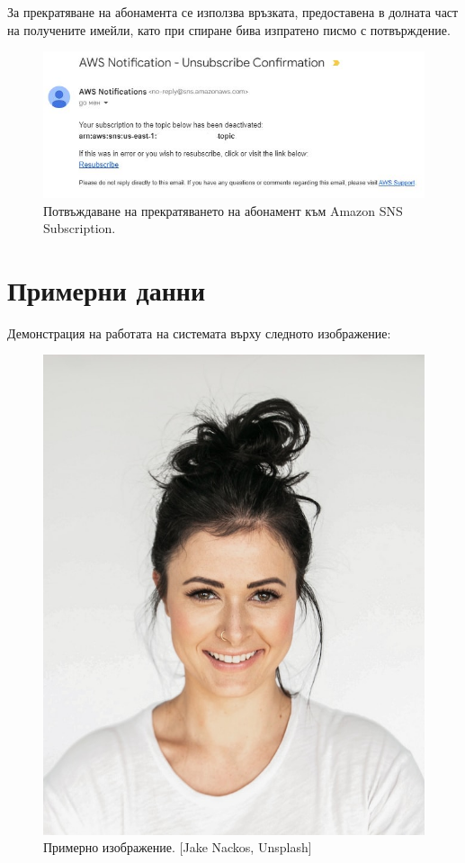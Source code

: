 \documentclass[12pt]{article}
\begin{document}
За прекратяване на абонамента се използва връзката, предоставена в долната част на получените имейли, като при спиране бива изпратено писмо с потвърждение.

\begin{figure}[h!]
\centering
    \includegraphics[scale=0.8]{user_guide/2.jpg}
  \caption{Потвъждаване на прекратяването на абонамент към Amazon SNS Subscription.}
\end{figure}

\clearpage
\pagebreak

\section{Примерни данни}

\hspace{\parindent}Демонстрация на работата на системата върху следното изображение:

\begin{figure}[h!]
\centering
    \includegraphics[scale=0.15]{example_image.jpg}
  \caption{Примерно изображение. [Jake Nackos, Unsplash]}
\end{figure}
\end{document}
